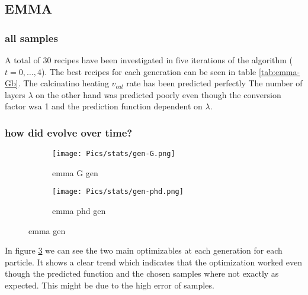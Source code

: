 \subsection{EMMA}

\subsubsection{all samples}
%
A total of 30 recipes have been investigated in 
five iterations of the algorithm ($t = 0, \dots,4$). 
The best recipes for each generation can be seen in table \ref{tab:emma-Gb}. 
The calcinatino heating $v_{cal}$ rate has been predicted perfectly 
The number of layers $\lambda$ on the other hand was predicted poorly 
even though the conversion factor wsa 1 and the prediction function dependent on $\lambda$. 

\subsubsection{how did evolve over time?}

\begin{figure}
    \centering
    \begin{subfigure}{.45\textwidth}
        \centering
        \texttt{[image: Pics/stats/gen-G.png]}
        \caption{emma G gen } \label{fig:emma-G-gen}
    \end{subfigure}
    \begin{subfigure}{.45\textwidth}
        \centering
        \texttt{[image: Pics/stats/gen-phd.png]}
        \caption{emma phd gen} \label{fig:emma-phd-gen}
    \end{subfigure}
    \caption{emma gen} \label{fig:emma-gen}
\end{figure}

In figure \ref{fig:emma-gen} we can see the two main optimizables at each generation
for each particle.
It shows a clear trend which indicates that the optimization worked even though 
the predicted function and the chosen samples where not exactly as expected. 
This might be due to the high error of samples. 


